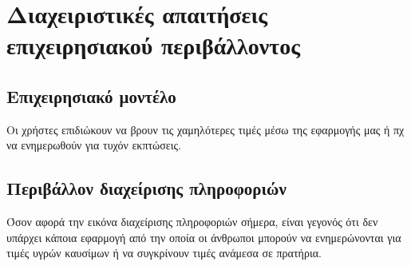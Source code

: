 \section{Διαχειριστικές απαιτήσεις επιχειρησιακού περιβάλλοντος}

\subsection{Επιχειρησιακό μοντέλο}
Οι χρήστες επιδιώκουν να βρουν τις χαμηλότερες τιμές μέσω της εφαρμογής μας ή πχ να ενημερωθούν για τυχόν εκπτώσεις.

\subsection{Περιβάλλον διαχείρισης πληροφοριών}
Όσον αφορά την εικόνα διαχείρισης πληροφοριών σήμερα, είναι γεγονός ότι δεν υπάρχει κάποια εφαρμογή από την οποία οι άνθρωποι μπορούν να ενημερώνονται για τιμές υγρών καυσίμων ή να συγκρίνουν τιμές ανάμεσα σε πρατήρια.


